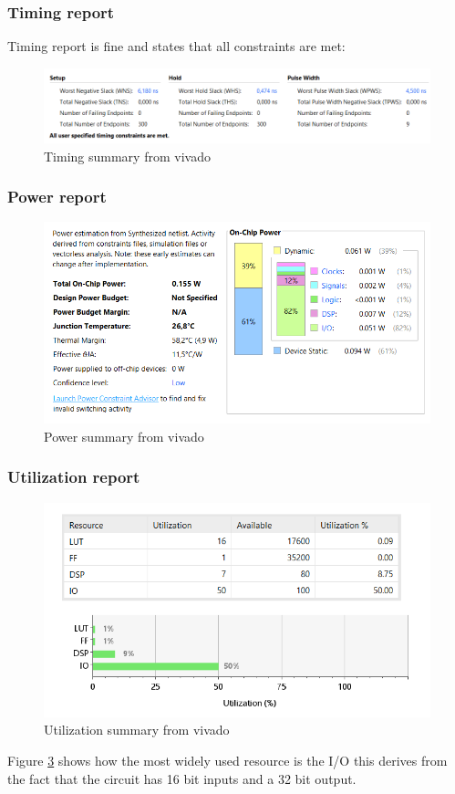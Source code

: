 \subsubsection{Timing report} %
\label{ssub:timing_report}
Timing report is fine and states that all constraints are met:
\begin{figure}[H]
  \centering
  \includegraphics[width=0.9\linewidth]{./images/timing.PNG}
  \caption{Timing summary from vivado}
  \label{fig:timing}
\end{figure}


\subsubsection{Power report} %
\label{ssub:power_report}
\begin{figure}[H]
  \centering
  \includegraphics[width=0.9\linewidth]{./images/power.PNG}
  \caption{Power summary from vivado}
  \label{fig:power}
\end{figure}

\subsubsection{Utilization report} %
\label{ssub:utilization_report}
\begin{figure}[H]
  \centering
  \includegraphics[width=0.9\linewidth]{./images/utilization.PNG}
  \caption{Utilization summary from vivado}
  \label{fig:utilization}
\end{figure}
Figure \ref{fig:utilization} shows how the most widely used resource is the I/O this derives from the fact that the circuit has 16 bit inputs and a 32 bit output.
